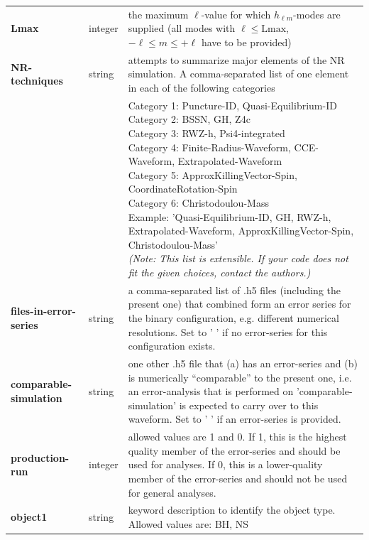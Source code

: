 \documentclass[11pt,tightenlines,article,amssymb,amsmath,amsfonts,superscriptaddress,nofootinbib]{revtex4}
\begin{document}
\begin{longtable}{|p{3.4cm}|p{1.6cm}|p{11.2cm}|}
\textbf{Lmax} & integer & the maximum $\ell$-value for which  $h_{\ell m}$-modes are supplied (all modes with $\ell \leq \mathrm{Lmax}$, $-\ell \leq m \leq +\ell$ have to be provided)\\

\textbf{NR-techniques} & string & attempts to summarize major elements of the NR simulation. A comma-separated list of one element in each of the following categories \\
  & & \parbox{11.2cm}{
Category 1: Puncture-ID, Quasi-Equilibrium-ID \\
Category 2: BSSN, GH, Z4c \\
Category 3: RWZ-h,  Psi4-integrated \\
Category 4: Finite-Radius-Waveform, CCE-Waveform, Extrapolated-Waveform \\
Category 5: ApproxKillingVector-Spin, CoordinateRotation-Spin \\
Category 6: Christodoulou-Mass \\
Example: 'Quasi-Equilibrium-ID, GH, RWZ-h, Extrapolated-Waveform, ApproxKillingVector-Spin, Christodoulou-Mass'\\
\emph{(Note: This list is extensible. If your code does not fit the given choices, contact the authors.)}
}\\
\textbf{files-in-error-series} & string &  a comma-separated list of .h5 files (including the present one) that combined form an error series for the binary configuration, e.g. different numerical resolutions. Set to ' ' if no error-series for this configuration exists.\\

\textbf{\footnotesize comparable-simulation} & string & one other .h5 file that (a) has an error-series and (b) is numerically ``comparable'' to the present one, i.e. an error-analysis that is performed on 'comparable-simulation' is expected to carry over to this waveform. Set to ' ' if an error-series is provided.\\

\textbf{production-run} & integer & allowed values are 1 and 0. If 1, this is the highest quality member of the error-series and should be used for analyses.  If 0, this is a lower-quality member of the error-series and should not be used for general analyses.\\

\textbf{object1} & string & keyword description to identify the object type. Allowed values are: BH, NS\\


\end{longtable}
\end{document}
